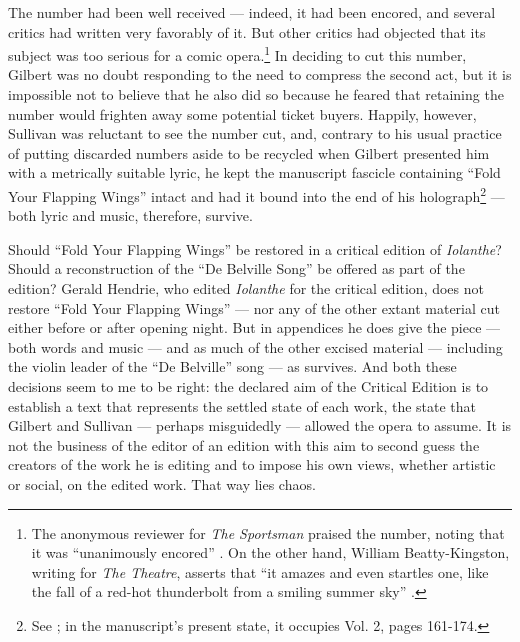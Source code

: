\begin{paper}
\noindent The number had been well received --- indeed, it had
been encored, and several critics had written very favorably of it. But
other critics had objected that its subject was too serious for a comic
opera.\footnote{The anonymous reviewer for \emph{The Sportsman} praised
  the number, noting that it was ``unanimously
  encored'' \citep[3]{anonymous_review_1882}. On the other hand, William Beatty-Kingston, writing for
  \emph{The Theatre}, asserts that ``it amazes
  and even startles one, like the fall of a red-hot thunderbolt from a
  smiling summer sky'' \citep[22]{beatty-kingston_review_1883}.} In deciding to cut this number, Gilbert was no
doubt responding to the need to compress the second act, but it is
impossible not to believe that he also did so because he feared that
retaining the number would frighten away some potential ticket buyers.
Happily, however, Sullivan was reluctant to see the number cut, and,
contrary to his usual practice of putting discarded numbers aside to be
recycled when Gilbert presented him with a metrically suitable lyric, he
kept the manuscript fascicle containing ``Fold Your Flapping Wings''
intact and had it bound into the end of his holograph\footnote{See \citealt{sullivan_iolanthe_1882}; in the manuscript's present state, it occupies Vol. 2, pages 161-174.} --- both lyric and music, therefore, survive.

Should ``Fold Your Flapping Wings'' be restored in a critical edition of
\emph{Iolanthe}? Should a reconstruction of the ``De Belville Song'' be
offered as part of the edition? Gerald Hendrie, who edited
\emph{Iolanthe} for the critical edition, does not restore ``Fold Your
Flapping Wings'' --- nor any of the other extant material cut either
before or after opening night. But in appendices he does give the
piece --- both words and music --- and as much of the other excised
material --- including the violin leader of the ``De Belville'' song --- as
survives. And both these decisions seem to me to be right: the declared
aim of the Critical Edition is to establish a text that represents the
settled state of each work, the state that Gilbert and Sullivan ---
perhaps misguidedly --- allowed the opera to assume. It is not the
business of the editor of an edition with this aim to second guess the
creators of the work he is editing and to impose his own views, whether
artistic or social, on the edited work. That way lies chaos.


\end{paper}
